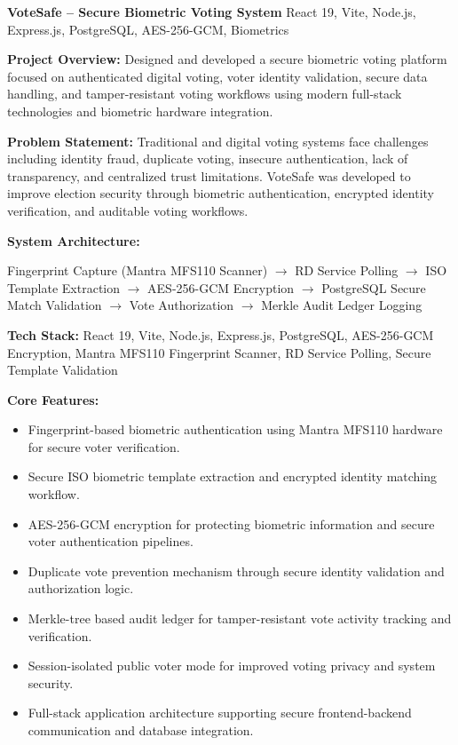 \documentclass[a4paper,11pt]{article}
\newcommand{\resumeProject}[2]{
\textbf{#1} \hfill {\small #2}
}
\begin{document}
\resumeProject
{VoteSafe -- Secure Biometric Voting System}
{React 19, Vite, Node.js, Express.js, PostgreSQL, AES-256-GCM, Biometrics}

\textbf{Project Overview:}
Designed and developed a secure biometric voting platform focused on authenticated digital voting, voter identity validation, secure data handling, and tamper-resistant voting workflows using modern full-stack technologies and biometric hardware integration.

\textbf{Problem Statement:}
Traditional and digital voting systems face challenges including identity fraud, duplicate voting, insecure authentication, lack of transparency, and centralized trust limitations. VoteSafe was developed to improve election security through biometric authentication, encrypted identity verification, and auditable voting workflows.

\textbf{System Architecture:}

Fingerprint Capture (Mantra MFS110 Scanner)
$\rightarrow$ RD Service Polling
$\rightarrow$ ISO Template Extraction
$\rightarrow$ AES-256-GCM Encryption
$\rightarrow$ PostgreSQL Secure Match Validation
$\rightarrow$ Vote Authorization
$\rightarrow$ Merkle Audit Ledger Logging

\textbf{Tech Stack:}
React 19, Vite, Node.js, Express.js, PostgreSQL, AES-256-GCM Encryption, Mantra MFS110 Fingerprint Scanner, RD Service Polling, Secure Template Validation

\textbf{Core Features:}
\begin{itemize}

    \item Fingerprint-based biometric authentication using Mantra MFS110 hardware for secure voter verification.

    \item Secure ISO biometric template extraction and encrypted identity matching workflow.

    \item AES-256-GCM encryption for protecting biometric information and secure voter authentication pipelines.

    \item Duplicate vote prevention mechanism through secure identity validation and authorization logic.

    \item Merkle-tree based audit ledger for tamper-resistant vote activity tracking and verification.

    \item Session-isolated public voter mode for improved voting privacy and system security.

    \item Full-stack application architecture supporting secure frontend-backend communication and database integration.

\end{itemize}
\end{document}
